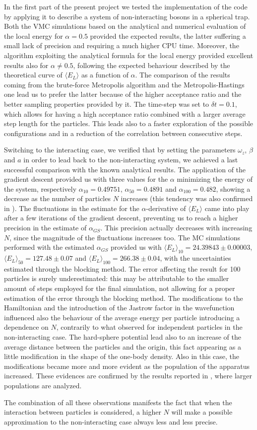 In the first part of the present project we tested the implementation of the code by applying it to describe a system of non-interacting bosons in a spherical trap. Both the VMC simulations based on the analytical and numerical evaluation of the local energy for $\alpha=0.5$ provided the expected results, the latter suffering a small lack of precision and requiring a much higher CPU time. Moreover, the algorithm exploiting the analytical formula for the local energy provided excellent results also for $\alpha\neq0.5$, following the expected behaviour described by the theoretical curve of $\langle E_L \rangle$ as a function of $\alpha$. The comparison of the results coming from the brute-force Metropolis algorithm and the Metropolis-Hastings one lead us to prefer the latter because of the higher acceptance ratio and the better sampling properties provided by it. The time-step was set to $\delta t = 0.1$, which allows for having a high acceptance ratio combined with a larger average step length for the particles. This leads also to a faster exploration of the possible configurations and in a reduction of the correlation between consecutive steps. 

Switching to the interacting case, we verified that by setting the parameters $\omega_z$, $\beta$ and $a$ in order to lead back to the non-interacting system, we achieved a last successful comparison with the known analytical results. The application of the gradient descent provided us with three values for the $\alpha$ minimizing the energy of the system, respectively $\alpha_{10}=0.49751$, $\alpha_{50}=0.4891$ and $\alpha_{100}=0.482$, showing a decrease as the number of particles $N$ increases (this tendency was also confirmed in \cite{Nilsen2005}). The fluctuations in the estimate for the $\alpha$-derivative of $\langle E_L \rangle$ came into play after a few iterations of the gradient descent, preventing us to reach a higher precision in the estimate of $\alpha_{GS}$. This precision actually decreases with increasing $N$, since the magnitude of the fluctuations increases too. The MC simulations performed with the estimated $\alpha_{GS}$ provided us with $\langle E_L \rangle_{10} = 24.39843 \pm 0.00003$, $\langle E_L \rangle_{50} = 127.48 \pm 0.07$ and $\langle E_L \rangle_{100} = 266.38 \pm 0.04$, with the uncertainties estimated through the blocking method. The error affecting the result for 100 particles is surely underestimated: this may be attributable to the smaller amount of steps employed for the final simulation, not allowing for a proper estimation of the error through the blocking method. The modifications to the Hamiltonian and the introduction of the Jastrow factor in the wavefunction influenced also the behaviour of the average energy per particle introducing a dependence on $N$, contrarily to what observed for independent particles in the non-interacting case. The hard-sphere potential lead also to an increase of the average distance between the particles and the origin, this fact appearing as a little modification in the shape of the one-body density. Also in this case, the modifications became more and more evident as the population of the apparatus increased. These evidences are confirmed by the results reported in \cite{duBois}, where larger populations are analyzed.

The combination of all these observations manifests the fact that when the interaction between particles is considered, a higher $N$ will make a possible approximation to the non-interacting case always less and less precise.